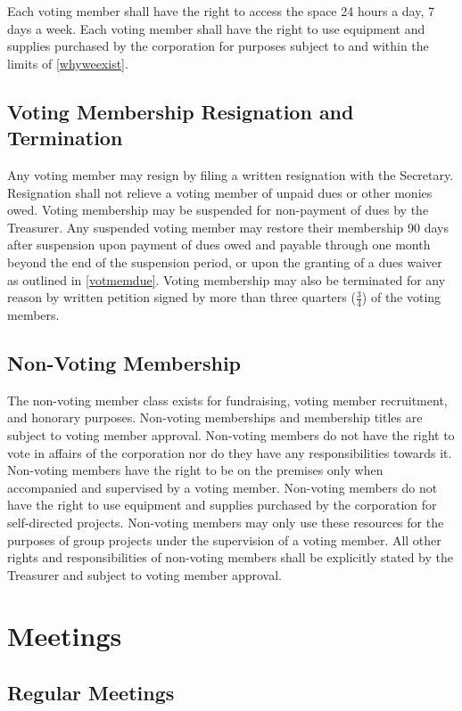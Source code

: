 \documentclass[10pt,letterpaper,titlepage]{article}
\begin{document}
Each voting member shall have the right to access the space 24 hours a day, 7
days a week.
Each voting member shall have the right to use equipment and supplies purchased
by the corporation for purposes subject to and within the limits of
\ref{whyweexist}. 

\subsection{Voting Membership Resignation and Termination}
 
Any voting member may resign by filing a written resignation with the
Secretary.
Resignation shall not relieve a voting member of unpaid dues or other monies
owed.
Voting membership may be suspended for non-payment of dues by the Treasurer.
Any suspended voting member may restore their membership 90 days after
suspension upon payment of dues owed and payable through one month beyond the
end of the suspension period, or upon the granting of a dues waiver as outlined
in \ref{votmemdue}.
Voting membership may also be terminated for any reason by written petition
signed by more than three quarters ($\frac{3}{4}$) of the voting members.

\subsection{Non-Voting Membership}
 
The non-voting member class exists for fundraising, voting member recruitment,
and honorary purposes.
Non-voting memberships and membership titles are subject to voting member
approval.
Non-voting members do not have the right to vote in affairs of the corporation
nor do they have any responsibilities towards it.
Non-voting members have the right to be on the premises only when accompanied
and supervised by a voting member.
Non-voting members do not have the right to use equipment and supplies
purchased by the corporation for self-directed projects.
Non-voting members may only use these resources for the purposes of group
projects under the supervision of a voting member.
All other rights and responsibilities of non-voting members shall be explicitly
stated by the Treasurer and subject to voting member approval.

\section{Meetings}

\subsection{Regular Meetings}
 
\end{document}
